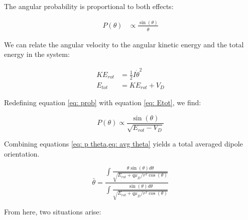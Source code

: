 The angular probability is proportional to both effects:

\begin{align}
    P(\theta) & \propto \frac{\sin(\theta)}{\dot{\theta}} \label{eq: prob}
\end{align}

We can relate the angular velocity to the angular kinetic energy and the total energy in the system:

\begin{align}
    KE_{rot} & = \frac{1}{2}I\dot{\theta}^2 \nonumber \\
    E_{tot} & = KE_{rot} + V_D \label{eq: Etot}
\end{align}

Redefining equation \ref{eq: prob} with equation \ref{eq: Etot}, we find:

\begin{equation}
    P(\theta) \propto \frac{\sin(\theta)}{\sqrt{E_{rot}-V_D}} \label{eq: p theta}
\end{equation}

Combining equations \cref{eq: p theta,eq: avg theta} yields a total averaged dipole orientation.

\begin{equation}
    \bar{\theta} = \frac{\int\frac{\theta \sin(\theta)d\theta}{\sqrt{E_{rot}+q\mu_D/r^2 \cos(\theta)}}}{\int\frac{\sin(\theta)d\theta}{\sqrt{E_{rot}+q\mu_D/r^2 \cos(\theta)}}} \label{eq: avg theta int}
\end{equation}

From here, two situations arise:

